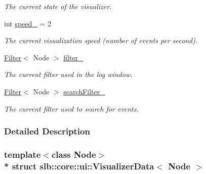 \begin{DoxyCompactItemize}
\begin{DoxyCompactList}\small\item\em The current state of the visualizer. \end{DoxyCompactList}\item 
int \hyperlink{structslb_1_1core_1_1ui_1_1VisualizerData_aad335a680641cfee2b0718b82a1d83a1}{speed\+\_\+} = 2\hypertarget{structslb_1_1core_1_1ui_1_1VisualizerData_aad335a680641cfee2b0718b82a1d83a1}{}\label{structslb_1_1core_1_1ui_1_1VisualizerData_aad335a680641cfee2b0718b82a1d83a1}

\begin{DoxyCompactList}\small\item\em The current visualization speed (number of events per second). \end{DoxyCompactList}\item 
\hyperlink{structslb_1_1core_1_1ui_1_1Filter}{Filter}$<$ Node $>$ \hyperlink{structslb_1_1core_1_1ui_1_1VisualizerData_a9448af08da7ed9da33a309bb48e07e7a}{filter\+\_\+}\hypertarget{structslb_1_1core_1_1ui_1_1VisualizerData_a9448af08da7ed9da33a309bb48e07e7a}{}\label{structslb_1_1core_1_1ui_1_1VisualizerData_a9448af08da7ed9da33a309bb48e07e7a}

\begin{DoxyCompactList}\small\item\em The current filter used in the log window. \end{DoxyCompactList}\item 
\hyperlink{structslb_1_1core_1_1ui_1_1Filter}{Filter}$<$ Node $>$ \hyperlink{structslb_1_1core_1_1ui_1_1VisualizerData_aab956310a22e4024447996c342578282}{search\+Filter\+\_\+}\hypertarget{structslb_1_1core_1_1ui_1_1VisualizerData_aab956310a22e4024447996c342578282}{}\label{structslb_1_1core_1_1ui_1_1VisualizerData_aab956310a22e4024447996c342578282}

\begin{DoxyCompactList}\small\item\em The current filter used to search for events. \end{DoxyCompactList}\end{DoxyCompactItemize}


\subsubsection{Detailed Description}
\subsubsection*{template$<$class Node$>$\\*
struct slb\+::core\+::ui\+::\+Visualizer\+Data$<$ Node $>$}

